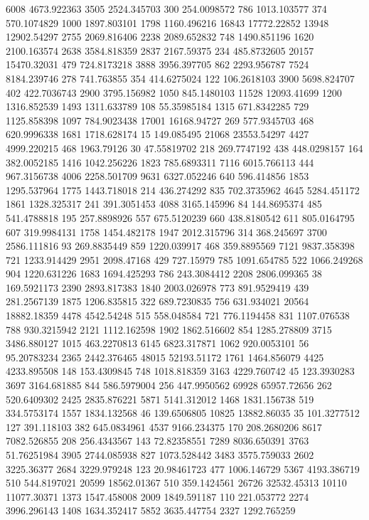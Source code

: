 6008	4673.922363
3505	2524.345703
300	254.0098572
786	1013.103577
374	570.1074829
1000	1897.803101
1798	1160.496216
16843	17772.22852
13948	12902.54297
2755	2069.816406
2238	2089.652832
748	1490.851196
1620	2100.163574
2638	3584.818359
2837	2167.59375
234	485.8732605
20157	15470.32031
479	724.8173218
3888	3956.397705
862	2293.956787
7524	8184.239746
278	741.763855
354	414.6275024
122	106.2618103
3900	5698.824707
402	422.7036743
2900	3795.156982
1050	845.1480103
11528	12093.41699
1200	1316.852539
1493	1311.633789
108	55.35985184
1315	671.8342285
729	1125.858398
1097	784.9023438
17001	16168.94727
269	577.9345703
468	620.9996338
1681	1718.628174
15	149.085495
21068	23553.54297
4427	4999.220215
468	1963.79126
30	47.55819702
218	269.7747192
438	448.0298157
164	382.0052185
1416	1042.256226
1823	785.6893311
7116	6015.766113
444	967.3156738
4006	2258.501709
9631	6327.052246
640	596.414856
1853	1295.537964
1775	1443.718018
214	436.274292
835	702.3735962
4645	5284.451172
1861	1328.325317
241	391.3051453
4088	3165.145996
84	144.8695374
485	541.4788818
195	257.8898926
557	675.5120239
660	438.8180542
611	805.0164795
607	319.9984131
1758	1454.482178
1947	2012.315796
314	368.245697
3700	2586.111816
93	269.8835449
859	1220.039917
468	359.8895569
7121	9837.358398
721	1233.914429
2951	2098.47168
429	727.15979
785	1091.654785
522	1066.249268
904	1220.631226
1683	1694.425293
786	243.3084412
2208	2806.099365
38	169.5921173
2390	2893.817383
1840	2003.026978
773	891.9529419
439	281.2567139
1875	1206.835815
322	689.7230835
756	631.934021
20564	18882.18359
4478	4542.54248
515	558.048584
721	776.1194458
831	1107.076538
788	930.3215942
2121	1112.162598
1902	1862.516602
854	1285.278809
3715	3486.880127
1015	463.2270813
6145	6823.317871
1062	920.0053101
56	95.20783234
2365	2442.376465
48015	52193.51172
1761	1464.856079
4425	4233.895508
148	153.4309845
748	1018.818359
3163	4229.760742
45	123.3930283
3697	3164.681885
844	586.5979004
256	447.9950562
69928	65957.72656
262	520.6409302
2425	2835.876221
5871	5141.312012
1468	1831.156738
519	334.5753174
1557	1834.132568
46	139.6506805
10825	13882.86035
35	101.3277512
127	391.118103
382	645.0834961
4537	9166.234375
170	208.2680206
8617	7082.526855
208	256.4343567
143	72.82358551
7289	8036.650391
3763	51.76251984
3905	2744.085938
827	1073.528442
3483	3575.759033
2602	3225.36377
2684	3229.979248
123	20.98461723
477	1006.146729
5367	4193.386719
510	544.8197021
20599	18562.01367
510	359.1424561
26726	32532.45313
10110	11077.30371
1373	1547.458008
2009	1849.591187
110	221.053772
2274	3996.296143
1408	1634.352417
5852	3635.447754
2327	1292.765259
